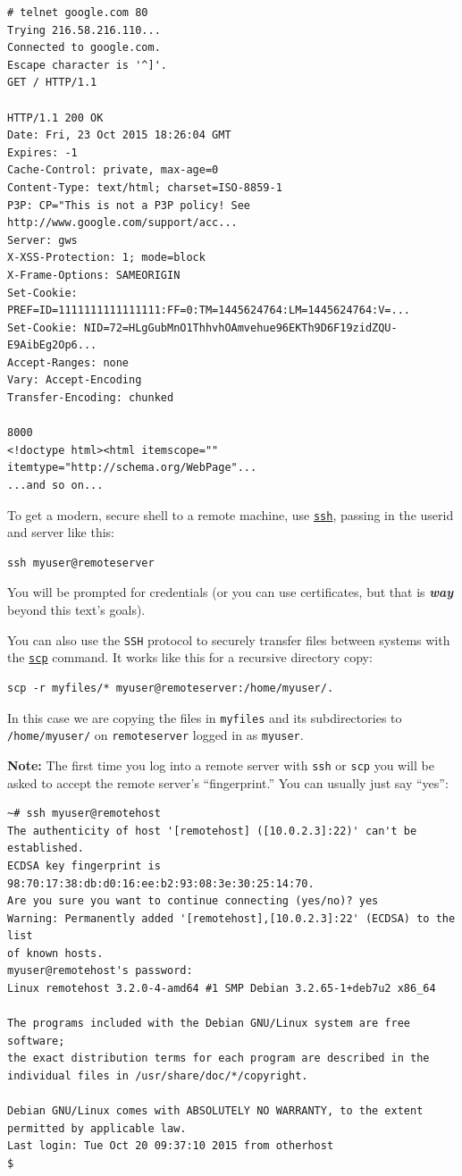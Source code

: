 \documentclass[10pt,]{book}
\numberwithin{figure}{chapter}
\begin{document}
\begin{verbatim}
# telnet google.com 80
Trying 216.58.216.110...
Connected to google.com.
Escape character is '^]'.
GET / HTTP/1.1

HTTP/1.1 200 OK
Date: Fri, 23 Oct 2015 18:26:04 GMT
Expires: -1
Cache-Control: private, max-age=0
Content-Type: text/html; charset=ISO-8859-1
P3P: CP="This is not a P3P policy! See http://www.google.com/support/acc...
Server: gws
X-XSS-Protection: 1; mode=block
X-Frame-Options: SAMEORIGIN
Set-Cookie: PREF=ID=1111111111111111:FF=0:TM=1445624764:LM=1445624764:V=...
Set-Cookie: NID=72=HLgGubMnO1ThhvhOAmvehue96EKTh9D6F19zidZQU-E9AibEg2Op6...
Accept-Ranges: none
Vary: Accept-Encoding
Transfer-Encoding: chunked

8000
<!doctype html><html itemscope="" itemtype="http://schema.org/WebPage"...
...and so on...
\end{verbatim}

To get a modern, secure shell to a remote machine, use
\href{http://linux.die.net/man/1/ssh}{\texttt{ssh}}, passing in the
userid and server like this:

\begin{verbatim}
ssh myuser@remoteserver
\end{verbatim}

You will be prompted for credentials (or you can use certificates, but
that is \textbf{\emph{way}} beyond this text's goals).

You can also use the \texttt{SSH} protocol to securely transfer files
between systems with the
\href{http://linux.die.net/man/1/scp}{\texttt{scp}} command. It works
like this for a recursive directory copy:

\begin{verbatim}
scp -r myfiles/* myuser@remoteserver:/home/myuser/.
\end{verbatim}

In this case we are copying the files in \texttt{myfiles} and its
subdirectories to \texttt{/home/myuser/} on \texttt{remoteserver} logged
in as \texttt{myuser}.

\textbf{Note:} The first time you log into a remote server with
\texttt{ssh} or \texttt{scp} you will be asked to accept the remote
server's ``fingerprint.'' You can usually just say ``yes'':

\begin{verbatim}
~# ssh myuser@remotehost
The authenticity of host '[remotehost] ([10.0.2.3]:22)' can't be established.
ECDSA key fingerprint is 98:70:17:38:db:d0:16:ee:b2:93:08:3e:30:25:14:70.
Are you sure you want to continue connecting (yes/no)? yes
Warning: Permanently added '[remotehost],[10.0.2.3]:22' (ECDSA) to the list
of known hosts.
myuser@remotehost's password:
Linux remotehost 3.2.0-4-amd64 #1 SMP Debian 3.2.65-1+deb7u2 x86_64

The programs included with the Debian GNU/Linux system are free software;
the exact distribution terms for each program are described in the
individual files in /usr/share/doc/*/copyright.

Debian GNU/Linux comes with ABSOLUTELY NO WARRANTY, to the extent
permitted by applicable law.
Last login: Tue Oct 20 09:37:10 2015 from otherhost
$
\end{verbatim}
\end{document}
